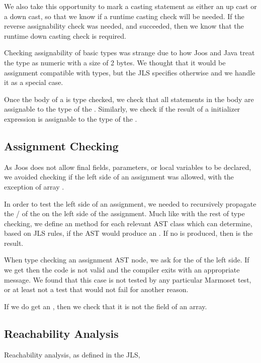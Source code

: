 \documentclass[pdftex,11pt,a4paper]{article}
\begin{document}
We also take this opportunity to mark a casting statement as either an
up cast or a down cast, so that we know if a runtime casting check
will be needed. If the reverse assignability check was needed, and
succeeded, then we know that the runtime down casting check is
required.

Checking assignability of basic types was strange due to how Joos and
Java treat the  type as numeric with a size of 2 bytes. We
thought that it would be assignment compatible with  types,
but the JLS specifies otherwise and we handle it as a special case.

Once the body of a  is type checked, we check that all
 statements in the body are assignable to the type of the
. Similarly, we check if the result of a 
initializer expression is assignable to the type of the .

\subsection{Assignment Checking}

As Joos does not allow final fields, parameters, or local variables to
be declared, we avoided checking if the left side of an assignment was
allowed, with the exception of array .

In order to test the left side of an assignment, we needed to
recursively propagate the / of the
 on the left side of the assignment. Much like with
the rest of type checking, we define an  method for each
relevant AST class which can determine, based on JLS rules, if the AST
would produce an . If no  is produced, then
 is the result.

When type checking an assignment AST node, we ask for the 
of the left side. If we get  then the code is not valid and
the compiler exits with an appropriate message. We found that this
case is not tested by any particular Marmoset test, or at least not a
test that would not fail for another reason.

If we do get an , then we check that it is not the
 field of an array.


\subsection{Reachability Analysis}

Reachability analysis, as defined in the JLS,
\end{document}
